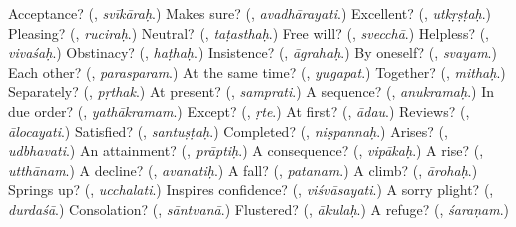 \begin{tcolorbox}[breakable,colback=teal!4,colframe=teal!35!black,title={Before you move on}]
Acceptance? (\textbf{}, \emph{svīkāraḥ}.) Makes sure? (\textbf{}, \emph{avadhārayati}.) Excellent? (\textbf{}, \emph{utkṛṣṭaḥ}.) Pleasing? (\textbf{}, \emph{ruciraḥ}.) Neutral? (\textbf{}, \emph{taṭasthaḥ}.) Free will? (\textbf{}, \emph{svecchā}.) Helpless? (\textbf{}, \emph{vivaśaḥ}.) Obstinacy? (\textbf{}, \emph{haṭhaḥ}.) Insistence? (\textbf{}, \emph{āgrahaḥ}.) By oneself? (\textbf{}, \emph{svayam}.) Each other? (\textbf{}, \emph{parasparam}.) At the same time? (\textbf{}, \emph{yugapat}.) Together? (\textbf{}, \emph{mithaḥ}.) Separately? (\textbf{}, \emph{pṛthak}.) At present? (\textbf{}, \emph{samprati}.) A sequence? (\textbf{}, \emph{anukramaḥ}.) In due order? (\textbf{}, \emph{yathākramam}.) Except? (\textbf{}, \emph{ṛte}.) At first? (\textbf{}, \emph{ādau}.) Reviews? (\textbf{}, \emph{ālocayati}.) Satisfied? (\textbf{}, \emph{santuṣṭaḥ}.) Completed? (\textbf{}, \emph{niṣpannaḥ}.) Arises? (\textbf{}, \emph{udbhavati}.) An attainment? (\textbf{}, \emph{prāptiḥ}.) A consequence? (\textbf{}, \emph{vipākaḥ}.) A rise? (\textbf{}, \emph{utthānam}.) A decline? (\textbf{}, \emph{avanatiḥ}.) A fall? (\textbf{}, \emph{patanam}.) A climb? (\textbf{}, \emph{ārohaḥ}.) Springs up? (\textbf{}, \emph{ucchalati}.) Inspires confidence? (\textbf{}, \emph{viśvāsayati}.) A sorry plight? (\textbf{}, \emph{durdaśā}.) Consolation? (\textbf{}, \emph{sāntvanā}.) Flustered? (\textbf{}, \emph{ākulaḥ}.) A refuge? (\textbf{}, \emph{śaraṇam}.)
\end{tcolorbox}
